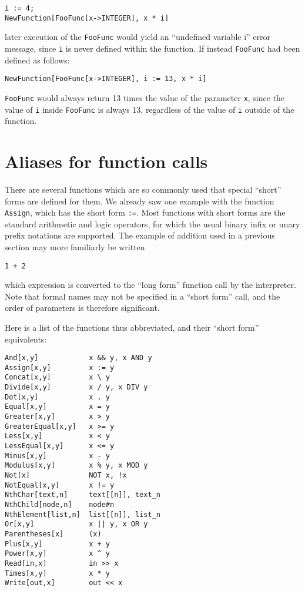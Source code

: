 \begin{verbatim}
i := 4;
NewFunction[FooFunc[x->INTEGER], x * i]
\end{verbatim}

\noindent later execution of the \verb+FooFunc+ would yield an
``undefined variable i'' error message, since \verb+i+ is never
defined within the function.  If instead \verb+FooFunc+ had been
defined as follows:

\begin{verbatim}
NewFunction[FooFunc[x->INTEGER], i := 13, x * i]
\end{verbatim}

\noindent \verb+FooFunc+ would always return 13 times the value of the
parameter \verb+x+, since the value of \verb+i+ inside \verb+FooFunc+
is always 13, regardless of the value of \verb+i+ outside of the
function.

\section{Aliases for function calls}

There are several functions which are so commonly used that special
``short'' forms are defined for them.  We already saw one example with
the function \verb+Assign+, which has the short form \verb+:=+.  Most
functions with short forms are the standard arithmetic and logic
operators, for which the usual binary infix or unary prefix notations
are supported.  The example of addition used in a previous section may
more familiarly be written

\begin{verbatim}
1 + 2
\end{verbatim}

\noindent which expression is converted to the ``long form'' function
call by the interpreter.  Note that formal names may not be specified
in a ``short form'' call, and the order of parameters is therefore
significant.

Here is a list of the functions thus abbreviated, and their ``short
form'' equivalents:

\medskip
\begin{multicols}{2}
\begin{verbatim}
And[x,y]            x && y, x AND y 
Assign[x,y]         x := y 
Concat[x,y]         x \ y 
Divide[x,y]         x / y, x DIV y 
Dot[x,y]            x . y 
Equal[x,y]          x = y 
Greater[x,y]        x > y 
GreaterEqual[x,y]   x >= y 
Less[x,y]           x < y 
LessEqual[x,y]      x <= y 
Minus[x,y]          x - y 
Modulus[x,y]        x % y, x MOD y 
Not[x]              NOT x, !x 
NotEqual[x,y]       x != y 
NthChar[text,n]     text[[n]], text_n 
NthChild[node,n]    node#n  
NthElement[list,n]  list[[n]], list_n
Or[x,y]             x || y, x OR y 
Parentheses[x]      (x) 
Plus[x,y]           x + y 
Power[x,y]          x ^ y 
Read[in,x]          in >> x 
Times[x,y]          x * y 
Write[out,x]        out << x 
\end{verbatim}
\end{multicols}

